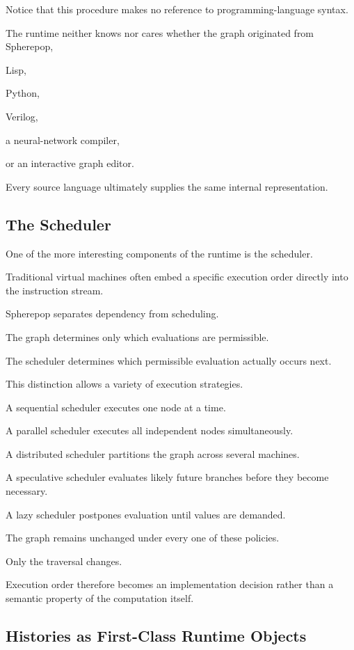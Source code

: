 \documentclass[12pt,oneside]{article}
\begin{document}
Notice that this procedure makes no reference to programming-language syntax.

The runtime neither knows nor cares whether the graph originated from Spherepop,

Lisp,

Python,

Verilog,

a neural-network compiler,

or an interactive graph editor.

Every source language ultimately supplies the same internal representation.

\subsection{The Scheduler}

One of the more interesting components of the runtime is the scheduler.

Traditional virtual machines often embed a specific execution order directly into the instruction stream.

Spherepop separates dependency from scheduling.

The graph determines only which evaluations are permissible.

The scheduler determines which permissible evaluation actually occurs next.

This distinction allows a variety of execution strategies.

A sequential scheduler executes one node at a time.

A parallel scheduler executes all independent nodes simultaneously.

A distributed scheduler partitions the graph across several machines.

A speculative scheduler evaluates likely future branches before they become necessary.

A lazy scheduler postpones evaluation until values are demanded.

The graph remains unchanged under every one of these policies.

Only the traversal changes.

Execution order therefore becomes an implementation decision rather than a semantic property of the computation itself.

\subsection{Histories as First-Class Runtime Objects}
\end{document}
